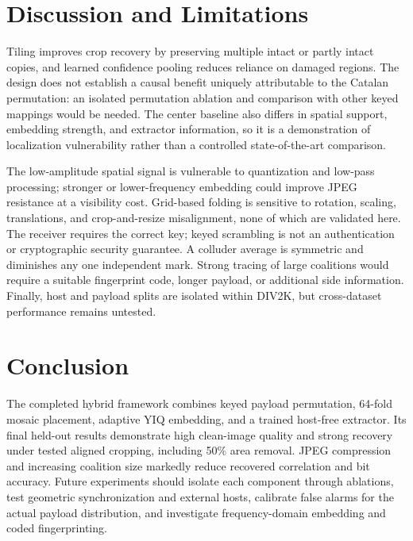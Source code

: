 \documentclass[conference]{IEEEtran}
\begin{document}
\section{Discussion and Limitations}
Tiling improves crop recovery by preserving multiple intact or partly intact copies, and learned confidence pooling reduces reliance on damaged regions. The design does not establish a causal benefit uniquely attributable to the Catalan permutation: an isolated permutation ablation and comparison with other keyed mappings would be needed. The center baseline also differs in spatial support, embedding strength, and extractor information, so it is a demonstration of localization vulnerability rather than a controlled state-of-the-art comparison.

The low-amplitude spatial signal is vulnerable to quantization and low-pass processing; stronger or lower-frequency embedding could improve JPEG resistance at a visibility cost. Grid-based folding is sensitive to rotation, scaling, translations, and crop-and-resize misalignment, none of which are validated here. The receiver requires the correct key; keyed scrambling is not an authentication or cryptographic security guarantee. A colluder average is symmetric and diminishes any one independent mark. Strong tracing of large coalitions would require a suitable fingerprint code, longer payload, or additional side information. Finally, host and payload splits are isolated within DIV2K, but cross-dataset performance remains untested.

\section{Conclusion}
The completed hybrid framework combines keyed payload permutation, 64-fold mosaic placement, adaptive YIQ embedding, and a trained host-free extractor. Its final held-out results demonstrate high clean-image quality and strong recovery under tested aligned cropping, including 50\% area removal. JPEG compression and increasing coalition size markedly reduce recovered correlation and bit accuracy. Future experiments should isolate each component through ablations, test geometric synchronization and external hosts, calibrate false alarms for the actual payload distribution, and investigate frequency-domain embedding and coded fingerprinting.
\end{document}
